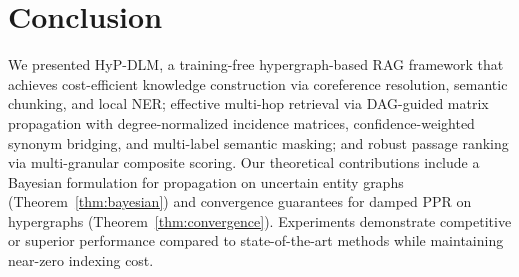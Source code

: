 \documentclass[11pt,a4paper]{article}
\begin{document}
\section{Conclusion}

We presented HyP-DLM, a training-free hypergraph-based RAG framework that achieves cost-efficient knowledge construction via coreference resolution, semantic chunking, and local NER; effective multi-hop retrieval via DAG-guided matrix propagation with degree-normalized incidence matrices, confidence-weighted synonym bridging, and multi-label semantic masking; and robust passage ranking via multi-granular composite scoring. Our theoretical contributions include a Bayesian formulation for propagation on uncertain entity graphs (Theorem~\ref{thm:bayesian}) and convergence guarantees for damped PPR on hypergraphs (Theorem~\ref{thm:convergence}). Experiments demonstrate competitive or superior performance compared to state-of-the-art methods while maintaining near-zero indexing cost.
\end{document}
